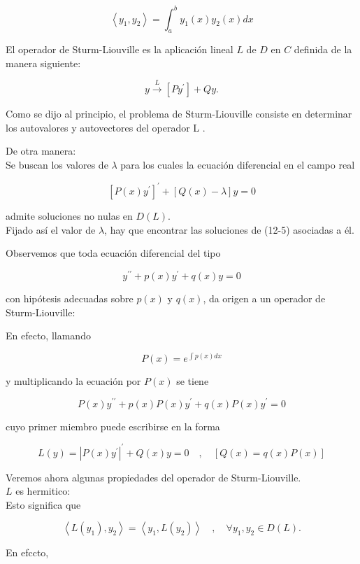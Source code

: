 \documentclass[10pt]{article}
\theoremstyle{plain}
\theoremstyle{definition}
\theoremstyle{remark}
\begin{document}
$$
\left\langle y_{1}, y_{2}\right\rangle=\int_{a}^{b} y_{1}(x) y_{2}(x) d x
$$

El operador de Sturm-Liouville es la aplicación lineal $L$ de $D$ en $C$ definida de la manera siguiente:

$$
y \xrightarrow{L}\left[P y^{\prime}\right]+Q y .
$$

Como se dijo al principio, el problema de Sturm-Liouville consiste en determinar los autovalores y autovectores del operador L .

De otra manera:\\
Se buscan los valores de $\lambda$ para los cuales la ecuación diferencial en el campo real


\begin{equation*}
\left[P(x) y^{\prime}\right]^{\prime}+[Q(x)-\lambda] y=0 \tag{12-5}
\end{equation*}


admite soluciones no nulas en $D(L)$.\\
Fijado así el valor de $\lambda$, hay que encontrar las soluciones de (12-5) asociadas a él.

Observemos que toda ecuación diferencial del tipo

$$
y^{\prime \prime}+p(x) y^{\prime}+q(x) y=0
$$

con hipótesis adecuadas sobre $p(x)$ y $q(x)$, da origen a un operador de Sturm-Liouville:

En efecto, llamando

$$
P(x)=e^{\int p(x) d x}
$$

y multiplicando la ecuación por $P(x)$ se tiene

$$
P(x) y^{\prime \prime}+p(x) P(x) y^{\prime}+q(x) P(x) y^{\prime}=0
$$

cuyo primer miembro puede escribirse en la forma

$$
L(y)=\left|P(x) y^{\prime}\right|^{\prime}+Q(x) y=0 \quad, \quad[Q(x)=q(x) P(x)]
$$

Veremos ahora algunas propiedades del operador de Sturm-Liouville.\\
$L$ es hermitico:\\
Esto significa que

$$
\left\langle L\left(y_{1}\right), y_{2}\right\rangle=\left\langle y_{1}, L\left(y_{2}\right)\right\rangle \quad, \quad \forall y_{1}, y_{2} \in D(L) .
$$

En efccto,
\end{document}
